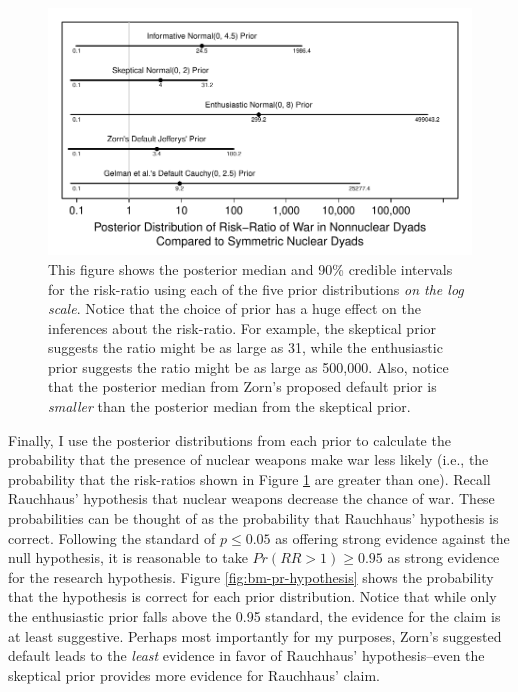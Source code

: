 \documentclass[12pt]{article}
\begin{document}
\begin{figure}[H]
\begin{center}
\includegraphics[scale = .8]{figs/bm-rr.pdf}
\caption{This figure shows the posterior median and 90\% credible intervals for the risk-ratio using each of the five prior distributions \emph{on the log scale}. Notice that the choice of prior has a huge effect on the inferences about the risk-ratio. For example, the skeptical prior suggests the ratio might be as large as 31, while the enthusiastic prior suggests the ratio might be as large as 500,000. Also, notice that the posterior median from Zorn's proposed default prior is \emph{smaller} than the posterior median from the skeptical prior.}\label{fig:bm-rr}
\end{center}
\end{figure}

%

Finally, I use the posterior distributions from each prior to calculate the probability that the presence of nuclear weapons make war less likely (i.e., the probability that the risk-ratios shown in Figure \ref{fig:bm-rr} are greater than one). Recall Rauchhaus' hypothesis that nuclear weapons decrease the chance of war. These probabilities can be thought of as the probability that Rauchhaus' hypothesis is correct. Following the standard of $p \leq 0.05$ as offering strong evidence against the null hypothesis, it is reasonable to take $Pr(RR > 1) \geq 0.95$ as strong evidence for the research hypothesis. Figure \ref{fig:bm-pr-hypothesis} shows the probability that the hypothesis is correct for each prior distribution. Notice that while only the enthusiastic prior falls above the 0.95 standard, the evidence for the claim is at least suggestive. Perhaps most importantly for my purposes, Zorn's suggested default leads to the \emph{least} evidence in favor of Rauchhaus' hypothesis--even the skeptical prior provides more evidence for Rauchhaus' claim.
\end{document}

